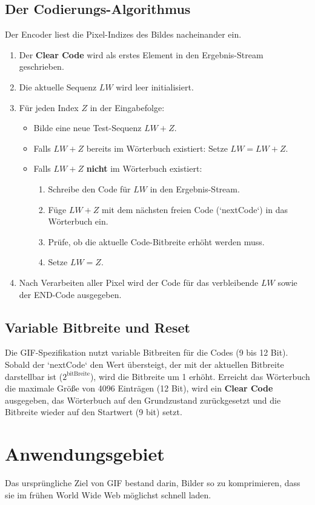 \documentclass[11pt,a4paper]{article}
\begin{document}
	
	
	\subsection{Der Codierungs-Algorithmus}
	Der Encoder liest die Pixel-Indizes des Bildes nacheinander ein.
	\begin{enumerate}
		\item Der \textbf{Clear Code} wird als erstes Element in den Ergebnis-Stream geschrieben.
		\item Die aktuelle Sequenz $LW$ wird leer initialisiert.
		\item Für jeden Index $Z$ in der Eingabefolge:
		\begin{itemize}
			\item Bilde eine neue Test-Sequenz $LW+Z$.
			\item Falls $LW+Z$ bereits im Wörterbuch existiert: Setze $LW = LW+Z$.
			\item Falls $LW+Z$ \textbf{nicht} im Wörterbuch existiert:
			\begin{enumerate}
				\item Schreibe den Code für $LW$ in den Ergebnis-Stream.
				\item Füge $LW+Z$ mit dem nächsten freien Code (`nextCode`) in das Wörterbuch ein.
				\item Prüfe, ob die aktuelle Code-Bitbreite erhöht werden muss.
				\item Setze $LW = Z$.
			\end{enumerate}
		\end{itemize}
		\item Nach Verarbeiten aller Pixel wird der Code für das verbleibende $LW$ sowie der {END-Code} ausgegeben.
	\end{enumerate}
	
	\subsection{Variable Bitbreite und Reset}
	Die GIF-Spezifikation nutzt variable Bitbreiten für die Codes (9 bis 12 Bit). Sobald der `nextCode` den Wert übersteigt, der mit der aktuellen Bitbreite darstellbar ist ($2^{\text{bitBreite}}$), wird die Bitbreite um 1 erhöht. Erreicht das Wörterbuch die maximale Größe von 4096 Einträgen (12 Bit), wird ein \textbf{Clear Code} ausgegeben, das Wörterbuch auf den Grundzustand zurückgesetzt und die Bitbreite wieder auf den Startwert (9 bit) setzt.
	
	\section{Anwendungsgebiet}
	Das ursprüngliche Ziel von GIF bestand darin, Bilder so zu komprimieren, dass sie im frühen World Wide Web möglichst schnell laden.
	
\end{document}
